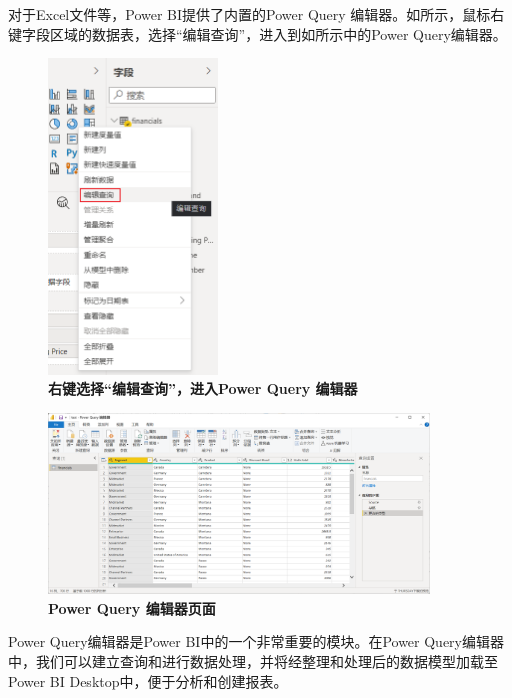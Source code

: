 对于Excel文件等，Power BI提供了内置的Power Query 编辑器。如所示，鼠标右键字段区域的数据表，选择``编辑查询''，进入到如所示中的Power Query编辑器。

\begin{figure}[htbp]
    \centering
    \includegraphics[width=0.4\textwidth]{figure/PowerBI/powerbi_select_query_editor.png}
    \caption{\textbf{右键选择``编辑查询''，进入Power Query 编辑器}}
    \label{fig:powerbi_select_query_editor}
\end{figure}

\begin{figure}[htbp]
    \centering
    \includegraphics[width=0.9\textwidth]{figure/PowerBI/powerbi_query_editor_detail.png}
    \caption{\textbf{Power Query 编辑器页面}}
    \label{fig:powerbi_query_editor_detail}
\end{figure}

Power Query编辑器是Power BI中的一个非常重要的模块。在Power Query编辑器中，我们可以建立查询和进行数据处理，并将经整理和处理后的数据模型加载至Power BI Desktop中，便于分析和创建报表。

